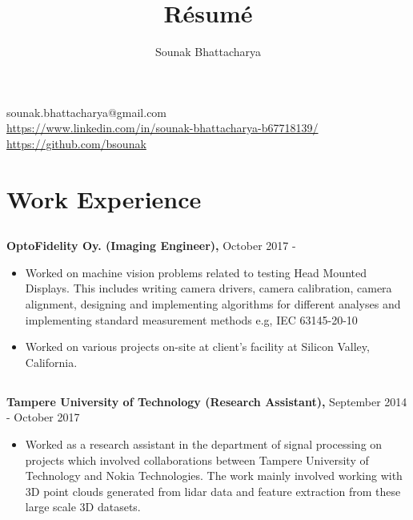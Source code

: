 \documentclass{article}
\renewcommand{\maketitle}{
\begin{center}
{\huge\bfseries
\theauthor}

\end{center}
}
\begin{document}
\title{R\'esum\'e}
\author{Sounak Bhattacharya}

\maketitle

\begin{center}
{\Large sounak.bhattacharya@gmail.com}\\
\url{https://www.linkedin.com/in/sounak-bhattacharya-b67718139/}\\
\url{https://github.com/bsounak} 
\end{center}

\section{Work Experience}
\subsection{}
\textbf{OptoFidelity Oy. (Imaging Engineer),} October 2017 -
\begin{itemize}[label={--}]
  \itemsep0em 

  \item Worked on machine vision problems related to testing Head Mounted
    Displays.  This includes writing camera drivers, camera calibration, camera
    alignment, designing and implementing algorithms for different analyses and
    implementing standard measurement methods e.g, IEC 63145-20-10

  \item Worked on various projects on-site at client's facility at Silicon
    Valley, California.
\end{itemize}

\subsection{}
\textbf{Tampere University of Technology (Research Assistant),} September 2014 -
  October 2017
\begin{itemize}[label={--}]
  \itemsep0em 

  \item Worked as a research assistant in the department of signal processing
    on projects which involved collaborations between Tampere University of
    Technology and Nokia Technologies.  The work mainly involved working with
    3D point clouds generated from lidar data and feature extraction from these
    large scale 3D datasets.
\end{itemize}
\end{document}
